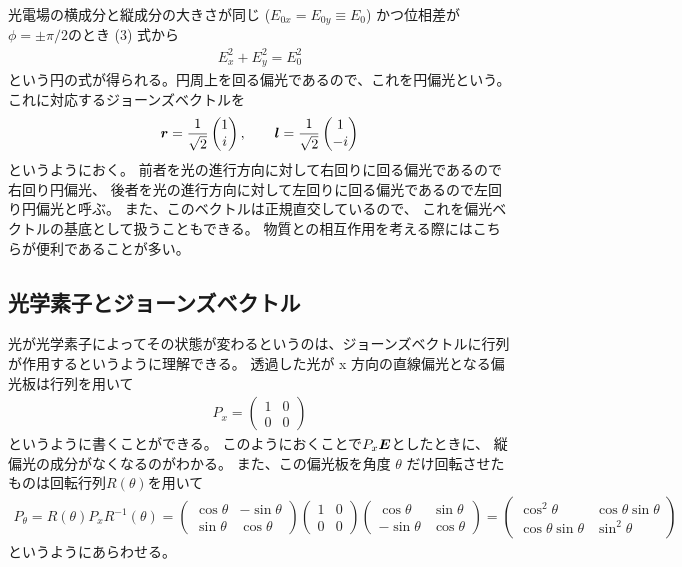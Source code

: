 \documentclass[9pt,dvipdfmx,a4paper]{jsarticle}
\begin{document}
光電場の横成分と縦成分の大きさが同じ (\(E_{0x}=E_{0y}\equiv E_0\)) かつ位相差が\(\phi=\pm\pi/2\)のとき
(3) 式から
\begin{align}
    E_x^2 + E_y^2 = E_0^2
\end{align}
という円の式が得られる。円周上を回る偏光であるので、これを円偏光という。
これに対応するジョーンズベクトルを
\begin{align}
    \vb*{r} = \frac{1}{\sqrt{2}}
    \begin{pmatrix}
        1\\i
    \end{pmatrix},\qquad
    \vb*{l} = \frac{1}{\sqrt{2}}
    \begin{pmatrix}
        1\\-i
    \end{pmatrix}
\end{align}
というようにおく。
前者を光の進行方向に対して右回りに回る偏光であるので右回り円偏光、
後者を光の進行方向に対して左回りに回る偏光であるので左回り円偏光と呼ぶ。
また、このベクトルは正規直交しているので、
これを偏光ベクトルの基底として扱うこともできる。
物質との相互作用を考える際にはこちらが便利であることが多い。

\subsection{光学素子とジョーンズベクトル}
光が光学素子によってその状態が変わるというのは、ジョーンズベクトルに行列が作用するというように理解できる。
透過した光が x 方向の直線偏光となる偏光板は行列を用いて
\begin{align}
    P_x =
    \begin{pmatrix}
        1 & 0\\
        0 & 0
    \end{pmatrix}
\end{align}
というように書くことができる。
このようにおくことで\(P_x \vb*{E}\)としたときに、
縦偏光の成分がなくなるのがわかる。
また、この偏光板を角度 \(\theta\) だけ回転させたものは回転行列\(R(\theta)\)を用いて
\begin{align}
    P_\theta = R(\theta)P_x R^{-1}(\theta)
    = \begin{pmatrix}
        \cos \theta & -\sin\theta\\
        \sin\theta & \cos\theta
    \end{pmatrix}
    \begin{pmatrix}
        1 & 0\\
        0 & 0
    \end{pmatrix}
    \begin{pmatrix}
        \cos \theta & \sin\theta\\
        -\sin\theta & \cos\theta
    \end{pmatrix}
    =\begin{pmatrix}
        \cos^2 \theta & \cos\theta\sin\theta\\
        \cos\theta\sin\theta & \sin^2\theta
    \end{pmatrix}
\end{align}
というようにあらわせる。
\end{document}
